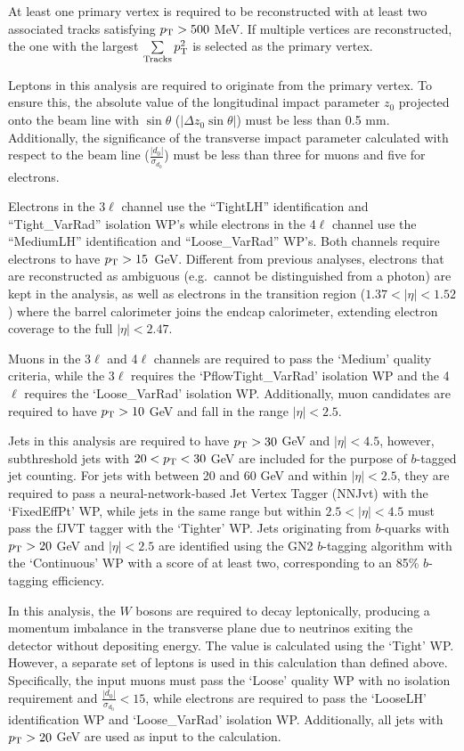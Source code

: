 At least one primary vertex is required to be reconstructed with at least two associated tracks satisfying $p_{\mathrm{T}} > 500$ MeV. If multiple vertices are reconstructed, the one with the largest $\sum\limits_{\mathrm{Tracks}} p_{\mathrm{T}}^{2}$ is selected as the primary vertex. 

Leptons in this analysis are required to originate from the primary vertex. To ensure this, the absolute value of the longitudinal impact parameter $z_0$ projected onto the beam line with $\sin{\theta}$ ($|\Delta{z_0}\sin{\theta}|$) must be less than 0.5 mm. Additionally, the significance of the transverse impact parameter calculated with respect to the beam line ($\frac{|d_0|}{\sigma_{d_{0}}}$) must be less than three for muons and five for electrons.

Electrons in the 3$\ell$ channel use the ``TightLH'' identification and ``Tight\_VarRad'' isolation WP's while electrons in the 4$\ell$ channel use the ``MediumLH'' identification and ``Loose\_VarRad'' WP's\@. Both channels require electrons to have $p_{\mathrm{T}}{} > 15$~GeV. Different from previous analyses, electrons that are reconstructed as ambiguous (e.g.\ cannot be distinguished from a photon) are kept in the analysis, as well as electrons in the transition region ($1.37 < |\eta| < 1.52$) where the barrel calorimeter joins the endcap calorimeter, extending electron coverage to the full $|\eta| < 2.47$.

Muons in the 3$\ell$ and 4$\ell$ channels are required to pass the `Medium' quality criteria, while the 3$\ell$ requires the `PflowTight\_VarRad' isolation WP and the 4$\ell$ requires the `Loose\_VarRad' isolation WP\@. Additionally, muon candidates are required to have $p_{\mathrm{T}} > 10$ GeV and fall in the range $|\eta| < 2.5$. 

Jets in this analysis are required to have $p_{\mathrm{T}} > 30$ GeV and $|\eta| < 4.5$, however, subthreshold jets with $20 < p_{\mathrm{T}} < 30$ GeV are included for the purpose of $b$-tagged jet counting. For jets with \pt{} between 20 and 60 GeV and within $|\eta| < 2.5$, they are required to pass a neural-network-based Jet Vertex Tagger (NNJvt) with the `FixedEffPt' WP, while jets in the same \pt{} range but within $2.5 < |\eta| < 4.5$ must pass the fJVT tagger with the `Tighter' WP\@. Jets originating from $b$-quarks with $p_{\mathrm{T}} > 20$ GeV and $|\eta| < 2.5$ are identified using the GN2 $b$-tagging algorithm with the `Continuous' WP with a score of at least two, corresponding to an 85\% $b$-tagging efficiency. 

In this analysis, the $W$ bosons are required to decay leptonically, producing a momentum imbalance in the transverse plane due to neutrinos exiting the detector without depositing energy. The \met{} value is calculated using the `Tight' WP\@. However, a separate set of leptons is used in this calculation than defined above. Specifically, the input muons must pass the `Loose' quality WP with no isolation requirement and $\frac{|d_0|}{\sigma_{d_{0}}} < 15$, while electrons are required to pass the `LooseLH' identification WP and `Loose\_VarRad' isolation WP\@. Additionally, all jets with $p_{\mathrm{T}} > 20$ GeV are used as input to the \met{} calculation.


